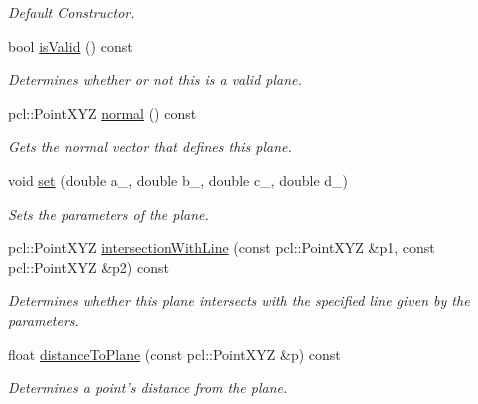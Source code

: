 \begin{DoxyCompactItemize}
\begin{DoxyCompactList}\small\item\em Default Constructor. \end{DoxyCompactList}\item 
bool \hyperlink{classope_1_1_plane_a9324f303beccf7ec9c6d3a5e371b7ca7}{is\-Valid} () const 
\begin{DoxyCompactList}\small\item\em Determines whether or not this is a valid plane. \end{DoxyCompactList}\item 
pcl\-::\-Point\-X\-Y\-Z \hyperlink{classope_1_1_plane_a8917005ae532501280c87222dfccd140}{normal} () const 
\begin{DoxyCompactList}\small\item\em Gets the normal vector that defines this plane. \end{DoxyCompactList}\item 
\hypertarget{classope_1_1_plane_a3c838097251cdaaf0248cc945eb99abc}{void \hyperlink{classope_1_1_plane_a3c838097251cdaaf0248cc945eb99abc}{set} (double a\-\_\-, double b\-\_\-, double c\-\_\-, double d\-\_\-)}\label{classope_1_1_plane_a3c838097251cdaaf0248cc945eb99abc}

\begin{DoxyCompactList}\small\item\em Sets the parameters of the plane. \end{DoxyCompactList}\item 
pcl\-::\-Point\-X\-Y\-Z \hyperlink{classope_1_1_plane_af6da1c5f2f479ac9b121fe429d4162a3}{intersection\-With\-Line} (const pcl\-::\-Point\-X\-Y\-Z \&p1, const pcl\-::\-Point\-X\-Y\-Z \&p2) const 
\begin{DoxyCompactList}\small\item\em Determines whether this plane intersects with the specified line given by the parameters. \end{DoxyCompactList}\item 
float \hyperlink{classope_1_1_plane_a6d49a848e73034756aa6037b330e5a68}{distance\-To\-Plane} (const pcl\-::\-Point\-X\-Y\-Z \&p) const 
\begin{DoxyCompactList}\small\item\em Determines a point's distance from the plane. \end{DoxyCompactList}\end{DoxyCompactItemize}
